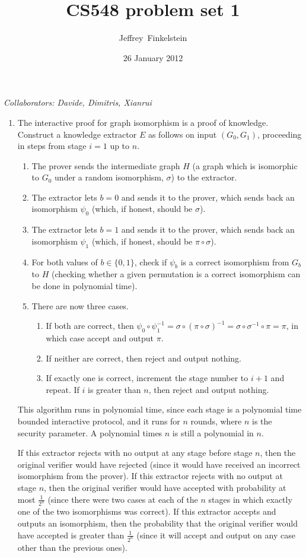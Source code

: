 \documentclass[draft]{article}
\author{Jef{}frey~Finkelstein}
\date{26 January 2012}
\title{CS548 problem set 1}
\newcommand{\collaborators}[1]{\emph{Collaborators: #1}}
\begin{document}
\maketitle
\collaborators{Davide, Dimitris, Xianrui}
\begin{enumerate}
\item
  The interactive proof for graph isomorphism is a proof of knowledge.
  Construct a knowledge extractor $E$ as follows on input $(G_0, G_1)$, proceeding in steps from stage $i=1$ up to $n$.
  \begin{enumerate}
  \item The prover sends the intermediate graph $H$ (a graph which is isomorphic to $G_0$ under a random isomorphism, $\sigma$) to the extractor.
  \item The extractor lets $b=0$ and sends it to the prover, which sends back an isomorphism $\psi_0$ (which, if honest, should be $\sigma$).
  \item The extractor lets $b=1$ and sends it to the prover, which sends back an isomorphism $\psi_1$ (which, if honest, should be $\pi\circ\sigma$).
  \item For both values of $b\in\{0,1\}$, check if $\psi_b$ is a correct isomorphism from $G_b$ to $H$ (checking whether a given permutation is a correct isomorphism can be done in polynomial time).
  \item
    There are now three cases.
    \begin{enumerate}
    \item If both are correct, then $\psi_0\circ\psi_1^{-1}=\sigma\circ(\pi\circ\sigma)^{-1}=\sigma\circ\sigma^{-1}\circ\pi=\pi$, in which case accept and output $\pi$.
    \item If neither are correct, then reject and output nothing.
    \item
      If exactly one is correct, increment the stage number to $i+1$ and repeat.
      If $i$ is greater than $n$, then reject and output nothing.
    \end{enumerate}
  \end{enumerate}
  This algorithm runs in polynomial time, since each stage is a polynomial time bounded interactive protocol, and it runs for $n$ rounds, where $n$ is the security parameter.
  A polynomial times $n$ is still a polynomial in $n$.

  If this extractor rejects with no output at any stage before stage $n$, then the original verifier would have rejected (since it would have received an incorrect isomorphism from the prover).
  If this extractor rejects with no output at stage $n$, then the original verifier would have accepted with probability at most $\frac{1}{2^n}$ (since there were two cases at each of the $n$ stages in which exactly one of the two isomorphisms was correct).
  If this extractor accepts and outputs an isomorphism, then the probability that the original verifier would have accepted is greater than $\frac{1}{2^n}$ (since it will accept and output on any case other than the previous ones).


\end{enumerate}
\end{document}
